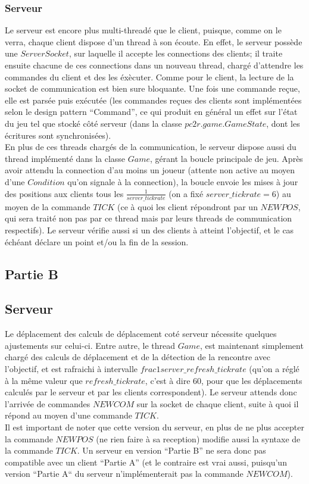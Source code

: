 \documentclass{article}
\begin{document}
\subsubsection{Serveur}
Le serveur est encore plus multi-threadé que le client, puisque, comme on le verra, chaque client dispose d'un thread à son écoute. En effet, le serveur possède une $ServerSocket$, sur laquelle il accepte les connections des clients; il traite ensuite chacune de ces connections dans un nouveau thread, chargé d'attendre les commandes du client et des les éxècuter. Comme pour le client, la lecture de la socket de communication est bien sure bloquante. Une fois une commande reçue, elle est parsée puis exécutée (les commandes reçues des clients sont implémentées selon le design pattern ``Command'', ce qui produit en général un effet sur l'état du jeu tel que stocké côté serveur (dans la classe $pc2r.game.GameState$, dont les écritures sont synchronisées).\\
En plus de ces threads chargés de la communication, le serveur dispose aussi du thread implémenté dans la classe $Game$, gérant la boucle principale de jeu. Après avoir attendu la connection d'au moins un joueur (attente non active au moyen d'une $Condition$ qu'on signale à la connection), la boucle envoie les mises à jour des positions aux clients tous les $\frac{1}{server\_tickrate}$ (on a fixé $server\_tickrate = 6$) au moyen de la commande $TICK$ (ce à quoi les client répondront par un $NEWPOS$, qui sera traité non pas par ce thread mais par leurs threads de communication respectifs). Le serveur vérifie aussi si un des clients à atteint l'objectif, et le cas échéant déclare un point et/ou la fin de la session.

\subsection{Partie B}

\subsection{Serveur}
Le déplacement des calculs de déplacement coté serveur nécessite quelques ajustements sur celui-ci. Entre autre, le thread $Game$, est maintenant simplement chargé des calculs de déplacement et de la détection de la rencontre avec l'objectif, et est rafraichi à intervalle $frac{1}{server\_refresh\_tickrate}$ (qu'on a réglé à la même valeur que $refresh\_tickrate$, c'est à dire $60$, pour que les déplacements calculés par le serveur et par les clients correspondent). Le serveur attends donc l'arrivée de commandes $NEWCOM$ sur la socket de chaque client, suite à quoi il répond au moyen d'une commande $TICK$.\\
Il est important de noter que cette version du serveur, en plus de ne plus accepter la commande $NEWPOS$ (ne rien faire à sa reception) modifie aussi la syntaxe de la commande $TICK$. Un serveur en version ``Partie B'' ne sera donc pas compatible avec un client ``Partie A'' (et le contraire est vrai aussi, puisqu'un version ``Partie A`` du serveur n'implémenterait pas la commande $NEWCOM$).
\end{document}
